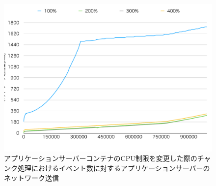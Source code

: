 \documentclass[../../../../../main]{subfiles}
\begin{document}
    \begin{figure}[H]
        \centering
        \includegraphics[width=12cm]{graph}
        \caption{アプリケーションサーバーコンテナのCPU制限を変更した際のチャンク処理におけるイベント数に対するアプリケーションサーバーのネットワーク送信}
        \label{fig:stream-change-app-cpu-limit-app-net-out-app_1024-db_1_1024}
    \end{figure}
\end{document}
